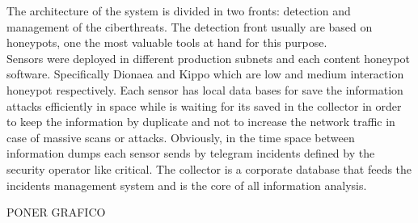 \documentclass[a4paper]{llncs}
\begin{document}
The architecture of the system is divided in two fronts: detection and management of the ciberthreats. The detection front usually are based on honeypots, one the most valuable tools at hand for this purpose.\\
Sensors were deployed in different production subnets and each content honeypot software. Specifically Dionaea\cite{dionaea} and Kippo\cite{kippo} which are low and medium interaction honeypot respectively. 
Each sensor has local data bases for save the information
 attacks efficiently in space 
 while is waiting 
 for its saved 
 in the collector in order to keep the information by duplicate and not to increase the network traffic in case of massive scans or attacks. Obviously, in the time space 
 between information dumps each sensor sends by telegram incidents
  defined by the security operator like critical. The collector is a corporate database that feeds the incidents management system 
  and is 
  the core of all information analysis.

PONER GRAFICO
\end{document}
